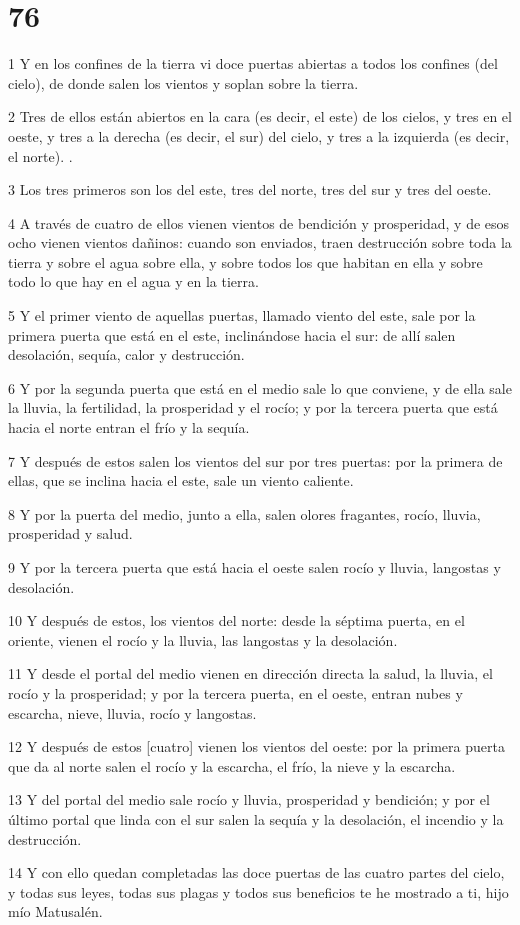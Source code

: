 \chapter{76}

\par 1 Y en los confines de la tierra vi doce puertas abiertas a todos los confines (del cielo), de donde salen los vientos y soplan sobre la tierra.
\par 2 Tres de ellos están abiertos en la cara (es decir, el este) de los cielos, y tres en el oeste, y tres a la derecha (es decir, el sur) del cielo, y tres a la izquierda (es decir, el norte). .
\par 3 Los tres primeros son los del este, tres del norte, tres del sur y tres del oeste.
\par 4 A través de cuatro de ellos vienen vientos de bendición y prosperidad, y de esos ocho vienen vientos dañinos: cuando son enviados, traen destrucción sobre toda la tierra y sobre el agua sobre ella, y sobre todos los que habitan en ella y sobre todo lo que hay en el agua y en la tierra.
\par 5 Y el primer viento de aquellas puertas, llamado viento del este, sale por la primera puerta que está en el este, inclinándose hacia el sur: de allí salen desolación, sequía, calor y destrucción.
\par 6 Y por la segunda puerta que está en el medio sale lo que conviene, y de ella sale la lluvia, la fertilidad, la prosperidad y el rocío; y por la tercera puerta que está hacia el norte entran el frío y la sequía.
\par 7 Y después de estos salen los vientos del sur por tres puertas: por la primera de ellas, que se inclina hacia el este, sale un viento caliente.
\par 8 Y por la puerta del medio, junto a ella, salen olores fragantes, rocío, lluvia, prosperidad y salud.
\par 9 Y por la tercera puerta que está hacia el oeste salen rocío y lluvia, langostas y desolación.
\par 10 Y después de estos, los vientos del norte: desde la séptima puerta, en el oriente, vienen el rocío y la lluvia, las langostas y la desolación.
\par 11 Y desde el portal del medio vienen en dirección directa la salud, la lluvia, el rocío y la prosperidad; y por la tercera puerta, en el oeste, entran nubes y escarcha, nieve, lluvia, rocío y langostas.
\par 12 Y después de estos [cuatro] vienen los vientos del oeste: por la primera puerta que da al norte salen el rocío y la escarcha, el frío, la nieve y la escarcha.
\par 13 Y del portal del medio sale rocío y lluvia, prosperidad y bendición; y por el último portal que linda con el sur salen la sequía y la desolación, el incendio y la destrucción.
\par 14 Y con ello quedan completadas las doce puertas de las cuatro partes del cielo, y todas sus leyes, todas sus plagas y todos sus beneficios te he mostrado a ti, hijo mío Matusalén.


